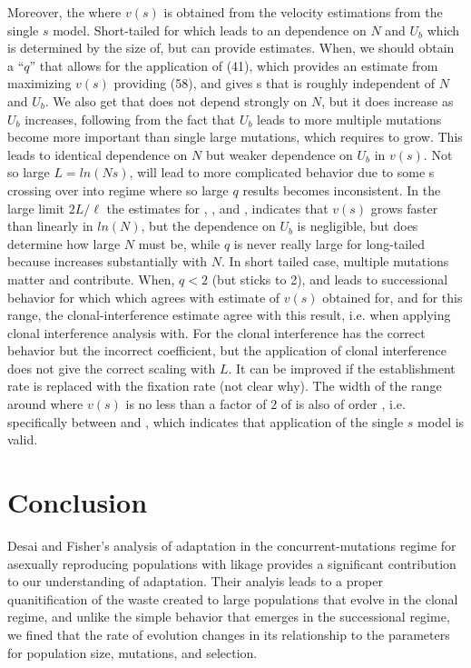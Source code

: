 \documentclass[12pt, two column]{article}
\begin{document}
Moreover, the where $v(s)$ is obtained from the velocity estimations from the single $s$ model.  Short-tailed for which leads to an dependence on $N$ and $U_b$ which is determined by  the size of, but can provide estimates.  When, we should obtain a “$q$” that allows for the application of (41), which provides an estimate  from maximizing $v(s)$ providing (58), and gives s that is roughly independent of $N$ and $U_b$.  We also get that does not depend strongly on $N$, but it does increase as $U_b$ increases, following from the fact that $U_b$ leads to more multiple mutations become more important than single large mutations, which requires to grow.  This leads to identical dependence on $N$ but weaker dependence on $U_b$ in $v(s)$.  Not so large $L=ln(Ns)$, will lead to more complicated behavior due to some s crossing over into regime where so large $q$ results becomes inconsistent.  In the large limit $2L/\ell$ the estimates for , , and , indicates that $v(s)$ grows faster than linearly in $ln(N)$, but the dependence on $U_b$ is negligible, but does determine how large $N$ must be, while $q$ is never really large for long-tailed because  increases substantially with $N$.  In short tailed case, multiple mutations matter and contribute.  When, $q<2$ (but sticks to 2), and leads to successional behavior for which which agrees with estimate of $v(s)$ obtained for, and for this range, the clonal-interference estimate agree with this result, i.e. when applying clonal interference analysis with.  
For the clonal interference has the correct behavior but the incorrect coefficient, but the application of clonal interference does not give the correct scaling with $L$.  It can be improved if the establishment rate is replaced with the fixation rate (not clear why).  The width of the range around where $v(s)$ is no less than a factor of 2 of is also of order , i.e. specifically between and , which indicates that application of the single $s$ model is valid.

\section*{Conclusion}
Desai and Fisher's analysis of adaptation in the concurrent-mutations regime for asexually reproducing populations with likage provides a significant contribution to our understanding of adaptation.  Their analyis leads to a proper quanitification of the waste created to large populations that evolve in the clonal regime, and unlike the simple behavior that emerges in the successional regime, we fined that the rate of evolution changes in its relationship to the parameters for population size, mutations, and selection.
\end{document}
